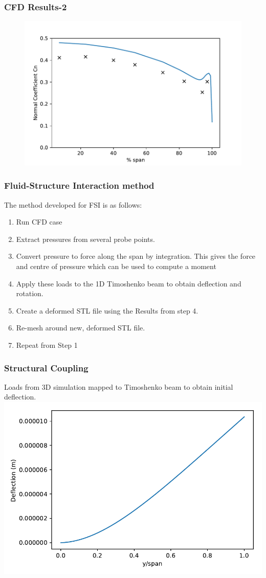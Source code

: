 \documentclass{beamer}
\begin{document}
\begin{frame}
	\frametitle{CFD Results-2}
	\begin{figure}

	\includegraphics[scale=0.75]{normal_dist_real.pdf}
\end{figure}
\end{frame}
\begin{frame}
	\frametitle{Fluid-Structure Interaction method}
	The method developed for FSI is as follows:
	\begin{enumerate}
		\item Run CFD case
		\item Extract pressures from several probe points.
		\item Convert pressure to force along the span by integration. This gives the force and centre of pressure which can be used to compute a moment
		\item Apply these loads to the 1D Timoshenko beam to obtain deflection and rotation.
		\item Create a deformed STL file using the Results from step 4.
		\item Re-mesh around new, deformed STL file.
		\item Repeat from Step 1
	\end{enumerate}
\end{frame}
\begin{frame}
	\frametitle{Structural Coupling}
	Loads from 3D simulation mapped to Timoshenko beam to obtain initial deflection.
	\includegraphics[scale=0.75]{deflection.pdf}
\end{frame}
\end{document}
